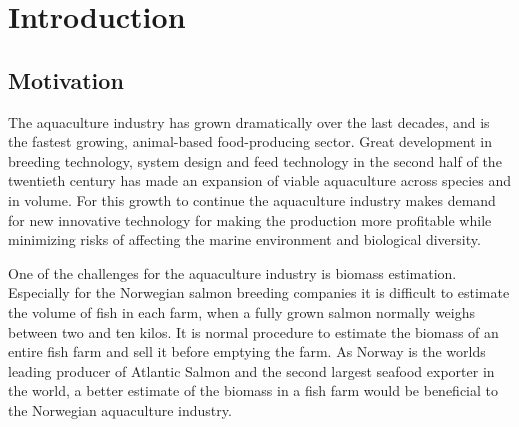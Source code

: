 \section{Introduction}\label{introduction}

\subsection{Motivation}\label{motivation}

The aquaculture industry has grown dramatically over the last decades, and is the fastest growing, animal-based food-producing sector. 
Great development in breeding technology, system design and feed technology in the second half of the twentieth century has made an expansion of viable aquaculture across species and in volume.
For this growth to continue the aquaculture industry makes demand for new innovative technology for making the production more profitable while minimizing risks of affecting the marine environment and biological diversity.\cite{website:aquaculture}

One of the challenges for the aquaculture industry is biomass estimation. Especially for the Norwegian salmon breeding companies it is difficult to estimate the volume of fish in each farm, when a fully grown salmon normally weighs between two and ten kilos.\cite{website:biomass} It is normal procedure to estimate the biomass of an entire fish farm and sell it before emptying the farm. As Norway is the worlds leading producer of Atlantic Salmon and the second largest seafood exporter in the world, a better estimate of the biomass in a fish farm would be beneficial to the Norwegian aquaculture industry.\cite{website:aquaculture}

